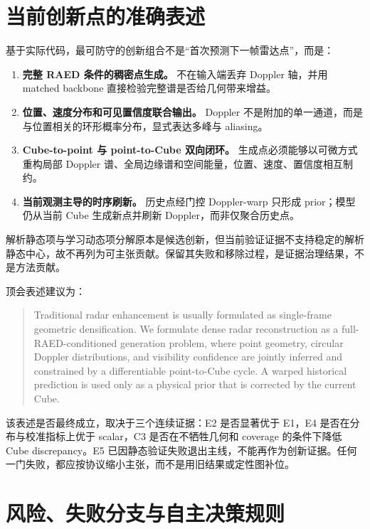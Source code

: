 \documentclass[11pt,a4paper,fontset=none]{ctexart}
\begin{document}
\section{当前创新点的准确表述}

基于实际代码，最可防守的创新组合不是“首次预测下一帧雷达点”，而是：
\begin{enumerate}
  \item \textbf{完整 RAED 条件的稠密点生成。} 不在输入端丢弃 Doppler 轴，并用 matched backbone 直接检验完整谱是否给几何带来增益。
  \item \textbf{位置、速度分布和可见置信度联合输出。} Doppler 不是附加的单一通道，而是与位置相关的环形概率分布，显式表达多峰与 aliasing。
  \item \textbf{Cube-to-point 与 point-to-Cube 双向闭环。} 生成点必须能够以可微方式重构局部 Doppler 谱、全局边缘谱和空间能量，位置、速度、置信度相互制约。
  \item \textbf{当前观测主导的时序刷新。} 历史点经门控 Doppler-warp 只形成 prior；模型仍从当前 Cube 生成新点并刷新 Doppler，而非仅聚合历史点。
\end{enumerate}

解析静态项与学习动态项分解原本是候选创新，但当前验证证据不支持稳定的解析静态中心，故不再列为可主张贡献。保留其失败和移除过程，是证据治理结果，不是方法贡献。

顶会表述建议为：
\begin{quote}
Traditional radar enhancement is usually formulated as single-frame geometric densification. We formulate dense radar reconstruction as a full-RAED-conditioned generation problem, where point geometry, circular Doppler distributions, and visibility confidence are jointly inferred and constrained by a differentiable point-to-Cube cycle. A warped historical prediction is used only as a physical prior that is corrected by the current Cube.
\end{quote}

该表述是否最终成立，取决于三个连续证据：E2 是否显著优于 E1，E4 是否在分布与校准指标上优于 scalar，C3 是否在不牺牲几何和 coverage 的条件下降低 Cube discrepancy。E5 已因静态验证失败退出主线，不能再作为创新证据。任何一门失败，都应按协议缩小主张，而不是用旧结果或定性图补位。

\section{风险、失败分支与自主决策规则}
\end{document}

